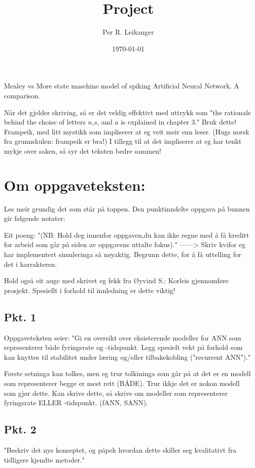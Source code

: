 \documentclass[a4paper,11 pt]{report}
\author{Per R. Leikanger}
\title{Project}
\date{\today}
\begin{document}
   

\maketitle

Mealey vs More state maschine model of spiking Artificial Neural Network. A comparison.


Når det gjelder skriving, så er det veldig effektivt med uttrykk som "the rationale behind the choise of letters $n$,$s$, and $a$ is explained in chapter 3."
Bruk dette! 
Frampeik, med litt mystikk som impliserer at eg veit meir enn leser. (Hugs norsk fra grunnskulen: frampeik er bra!)
I tillegg til at det impliserer at eg har tenkt mykje over saken, så syr det teksten bedre sammen!


\chapter{Om oppgaveteksten:}
Les meir grundig det som står på toppen. Den punktinndelte oppgava på bunnen gir følgende notater:

Eit poeng: "(NB: Hold deg innenfor oppgaven,du kan ikke regne med å få
kreditt for arbeid som går på siden av oppgavens uttalte fokus)."
------> Skriv kvifor eg har implementert simuleringa så nøyaktig. Begrunn dette, for å få uttelling for det i karrakteren. 

Hold også eit auge med skrivet eg fekk fra Øyvind S.: Korleis gjennomføre prosjekt. Spesiellt i forhold til innledning er dette viktig!
	\section{Pkt. 1}
Oppgaveteksten seier: "Gi en oversikt over eksisterende modeller for ANN som representerer både fyringsrate og -tidspunkt. 
Legg spesielt vekt på forhold som kan knyttes til stabilitet under læring og/eller tilbakekobling ("recurrent ANN")."

Første setninga kan tolkes, men eg trur tolkininga som går på at det er en modell som representerer begge er mest rett (BÅDE). 
Trur ikkje det er nokon modell som gjør dette. Kan skrive dette, så skrive om modeller som representerer fyringsrate ELLER -tidspunkt. (fANN, SANN).


	\section{Pkt. 2}
"Beskriv det nye konseptet, og påpek hvordan dette skiller seg kvalitativt fra tidligere kjendte metoder."
\end{document}
